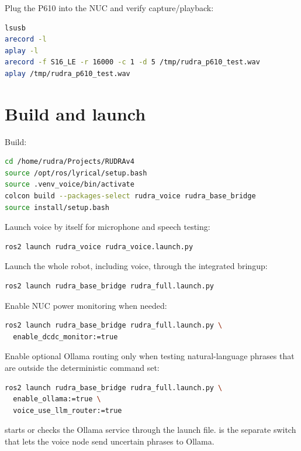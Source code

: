 Plug the P610 into the NUC and verify capture/playback:

\begin{lstlisting}[language=bash]
lsusb
arecord -l
aplay -l
arecord -f S16_LE -r 16000 -c 1 -d 5 /tmp/rudra_p610_test.wav
aplay /tmp/rudra_p610_test.wav
\end{lstlisting}

\section{Build and launch}

Build:

\begin{lstlisting}[language=bash]
cd /home/rudra/Projects/RUDRAv4
source /opt/ros/lyrical/setup.bash
source .venv_voice/bin/activate
colcon build --packages-select rudra_voice rudra_base_bridge
source install/setup.bash
\end{lstlisting}

Launch voice by itself for microphone and speech testing:

\begin{lstlisting}[language=bash]
ros2 launch rudra_voice rudra_voice.launch.py
\end{lstlisting}

Launch the whole robot, including voice, through the integrated bringup:

\begin{lstlisting}[language=bash]
ros2 launch rudra_base_bridge rudra_full.launch.py
\end{lstlisting}

Enable NUC power monitoring when needed:

\begin{lstlisting}[language=bash]
ros2 launch rudra_base_bridge rudra_full.launch.py \
  enable_dcdc_monitor:=true
\end{lstlisting}

Enable optional Ollama routing only when testing natural-language phrases that are outside the deterministic command set:

\begin{lstlisting}[language=bash]
ros2 launch rudra_base_bridge rudra_full.launch.py \
  enable_ollama:=true \
  voice_use_llm_router:=true
\end{lstlisting}

 starts or checks the Ollama service through the launch file.  is the separate switch that lets the voice node send uncertain phrases to Ollama.

